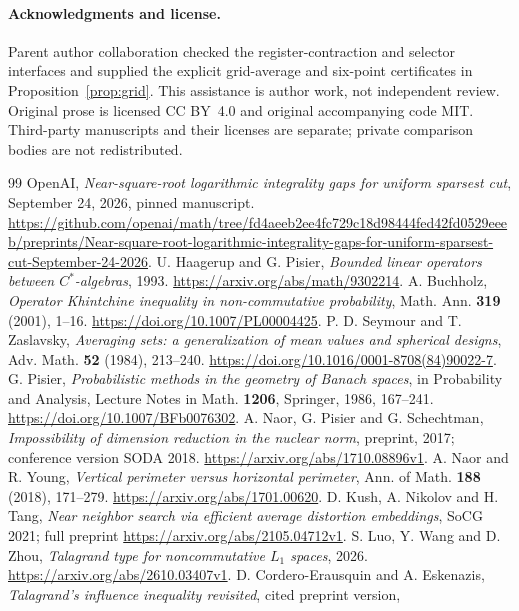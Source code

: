 \documentclass[11pt]{article}
\theoremstyle{remark}\newtheorem{remark}[theorem]{Remark}
\numberwithin{equation}{section}
\begin{document}
\paragraph{Acknowledgments and license.}
Parent author collaboration checked the register-contraction and selector
interfaces and supplied the explicit grid-average and six-point
certificates in Proposition~\ref{prop:grid}. This assistance is author
work, not independent review. Original prose is licensed CC BY~4.0 and
original accompanying code MIT. Third-party manuscripts and their
licenses are separate; private comparison bodies are not redistributed.

\begin{thebibliography}{99}
 OpenAI, \emph{Near-square-root logarithmic integrality gaps
for uniform sparsest cut}, September 24, 2026, pinned manuscript.
\url{https://github.com/openai/math/tree/fd4aeeb2ee4fc729c18d98444fed42fd0529eeeb/preprints/Near-square-root-logarithmic-integrality-gaps-for-uniform-sparsest-cut-September-24-2026}.
 U. Haagerup and G. Pisier, \emph{Bounded linear operators
between $C^*$-algebras}, 1993. \url{https://arxiv.org/abs/math/9302214}.
 A. Buchholz, \emph{Operator Khintchine inequality in
non-commutative probability}, Math. Ann. \textbf{319} (2001), 1--16.
\url{https://doi.org/10.1007/PL00004425}.
 P. D. Seymour and T. Zaslavsky, \emph{Averaging sets:
a generalization of mean values and spherical designs}, Adv. Math.
\textbf{52} (1984), 213--240.
\url{https://doi.org/10.1016/0001-8708(84)90022-7}.
 G. Pisier, \emph{Probabilistic methods in the geometry
of Banach spaces}, in Probability and Analysis, Lecture Notes in Math.
\textbf{1206}, Springer, 1986, 167--241.
\url{https://doi.org/10.1007/BFb0076302}.
 A. Naor, G. Pisier and G. Schechtman, \emph{Impossibility
of dimension reduction in the nuclear norm}, preprint, 2017;
conference version SODA 2018. \url{https://arxiv.org/abs/1710.08896v1}.
 A. Naor and R. Young, \emph{Vertical perimeter versus
horizontal perimeter}, Ann. of Math. \textbf{188} (2018), 171--279.
\url{https://arxiv.org/abs/1701.00620}.
 D. Kush, A. Nikolov and H. Tang, \emph{Near neighbor
search via efficient average distortion embeddings}, SoCG 2021;
full preprint \url{https://arxiv.org/abs/2105.04712v1}.
 S. Luo, Y. Wang and D. Zhou, \emph{Talagrand type for
noncommutative $L_1$ spaces}, 2026.
\url{https://arxiv.org/abs/2610.03407v1}.
 D. Cordero-Erausquin and A. Eskenazis,
\emph{Talagrand's influence inequality revisited}, cited preprint version,

\end{thebibliography}
\end{document}
